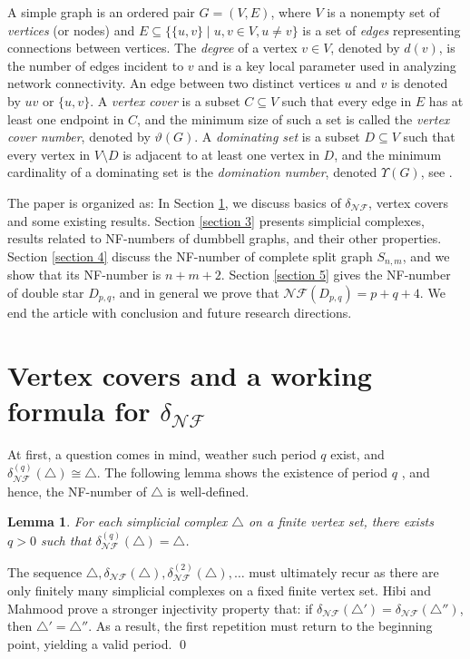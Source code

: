 \documentclass[12pt]{article}
\renewenvironment{proof}{{\noindent\bfseries Proof.}}{\qed}
\theoremstyle{plain}
\newtheorem{lemma}[theorem]{Lemma}
\theoremstyle{definition}
\begin{document}
		
		
		A simple graph is an ordered pair $G=(V,E)$, where $V$ is a nonempty set of \emph{vertices} (or nodes) and $E \subseteq \{\{u,v\}\mid u,v \in V, u\neq v\}$ is a set of \emph{edges} representing connections between vertices. The \emph{degree} of a vertex $v\in V$, denoted by $d(v)$, is the number of edges incident to $v$ and is a key local parameter used in analyzing network connectivity. An edge between two distinct vertices $u$ and $v$ is denoted by $uv$ or $\{u,v\}.$ A \emph{vertex cover} is a subset $C \subseteq V$ such that every edge in $E$ has at least one endpoint in $C$, and the minimum size of such a set is called the \emph{vertex cover number}, denoted by $\vartheta(G)$. A \emph{dominating set} is a subset $D \subseteq V$ such that every vertex in $V\setminus D$ is adjacent to at least one vertex in $D$, and the minimum cardinality of a dominating set is the \emph{domination number}, denoted $\varUpsilon(G)$, see \cite{West2001}. 
		
	\medskip
	
	
	The paper is organized as: In Section \ref{section 2}, we discuss basics of $\delta_{\mathcal{NF}}$, vertex covers and some existing results. Section \ref{section 3} presents simplicial complexes, results related to NF-numbers of dumbbell graphs, and their other properties.  Section \ref{section 4} discuss the  NF-number of complete split graph $S_{n,m}$, and we show that  its NF-number is $n+m+2$. Section \ref{section 5} gives the NF-number of double star $D_{p,q}$, and in general we prove that $\mathcal{NF}(D_{p,q})=p+q+4.$ We end the article with conclusion and future research directions.
	\section{Vertex covers and a working formula for $\delta_{\mathcal{NF}}$}\label{section 2}
	At first, a question comes in mind, weather such period $q$ exist, and  $\delta_{\mathcal{NF}}^{(q)}(\bigtriangleup)\cong \bigtriangleup$. The following lemma shows the existence of period $q$  \cite{HibiMahmood2020}, and hence, the NF-number of $\bigtriangleup$ is well-defined.
	\begin{lemma}
		For each simplicial complex $\bigtriangleup$ on a finite vertex set, there exists $q>0$ such that $\delta_{\mathcal{NF}}^{(q)}(\bigtriangleup)=\bigtriangleup$.
	\end{lemma}
	
	\begin{proof}
		The sequence $\bigtriangleup,\delta_{\mathcal{NF}}(\bigtriangleup),\delta_{\mathcal{NF}}^{(2)}(\bigtriangleup),\dots$ must ultimately recur as there are only finitely many simplicial complexes on a fixed finite vertex set.
		Hibi and Mahmood \cite[Lemma 1.4]{HibiMahmood2020} prove a stronger injectivity property that: if $\delta_{\mathcal{NF}}(\bigtriangleup')=\delta_{\mathcal{NF}}(\bigtriangleup'')$, then $\bigtriangleup'=\bigtriangleup''$. As a result, the first repetition must return to the beginning point, yielding a valid period.
	\end{proof}
	
\end{document}
